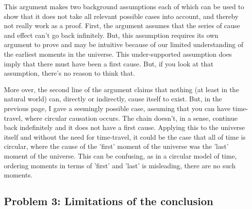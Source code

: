 This argument makes two background assumptions each of which can be used to show that it does not take all relevant possible cases into account, and thereby not really work as a proof. First, the argument assumes that the series of cause and effect can’t go back infinitely. But, this assumption requires its own argument to prove and may be intuitive because of our limited understanding of the earliest moments in the universe. This under-supported assumption does imply that there must have been a first cause. But, if you look at that assumption, there’s no reason to think that.

More over, the second line of the argument claims that nothing (at least in the natural world) can, directly or indirectly, cause itself to exist. But, in the previous page, I gave a seemingly possible case, assuming that you can have time-travel, where circular causation occurs. The chain doesn't, in a sense, continue back indefinitely and it does not have a first cause. Applying this to the universe itself and without the need for time-travel, it could be the case that all of time is circular, where the cause of the 'first' moment of the universe was the 'last' moment of the universe. This can be confusing, as in a circular model of time, ordering moments in terms of 'first' and 'last' is misleading, there are no such moments. 
\subsection{Problem 3: Limitations of the conclusion}


